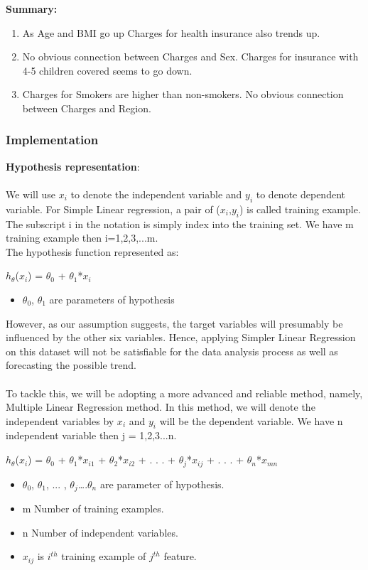 \documentclass[a4paper]{article}
\begin{document}
\textbf{Summary:}
\begin{enumerate}
    \item As Age and BMI go up Charges for health insurance also trends up.
    \item No obvious connection between Charges and Sex. Charges for insurance with 4-5 children covered seems to go down.
    \item Charges for Smokers are higher than non-smokers. No obvious connection between Charges and Region.
\end{enumerate}
\subsubsection{Implementation}

\textbf{Hypothesis representation}: \\ \\
We will use $x_i$ to denote the independent variable and $y_i$ to denote dependent variable. For Simple Linear regression, a pair of ($x_i$,$y_i$) is called training example. The subscript i in the notation is simply index into the training set. We have m training example then i=1,2,3,...m. \\
The hypothesis function represented as:
\begin{center}
    $h_\theta$($x_i$) = $\theta_0$ + $\theta_1$*$x_i$
\end{center}
\begin{itemize}
    \item $\theta_0$, $\theta_1$ are parameters of hypothesis
\end{itemize}
However, as our assumption suggests, the target variables will presumably be influenced by the other six variables. Hence, applying Simpler Linear Regression on this dataset will not be satisfiable for the data analysis process as well as forecasting the possible trend. \\ \\
To tackle this, we will be adopting a more advanced and reliable method, namely, Multiple Linear Regression method. In this method, we will denote the independent variables by $x_i$ and $y_i$ will be the dependent variable. We have n independent variable then j = 1,2,3...n. 
\begin{center}
    $h_\theta$($x_i$) = $\theta_0$ + $\theta_1$*$x_{i1}$ + $\theta_2$*$x_{i2}$ + . . . + $\theta_j$*$x_{ij}$ + . . . + $\theta_n$*$x_{mn}$
\end{center}
\begin{itemize}
    \item $\theta_0$, $\theta_1$, ... , $\theta_j$….$\theta_n$ are parameter of hypothesis.
    \item m Number of training examples.
    \item n Number of independent variables.
    \item $x_{ij}$ is $i^{th}$ training example of $j^{th}$ feature.
\end{itemize}
\end{document}
